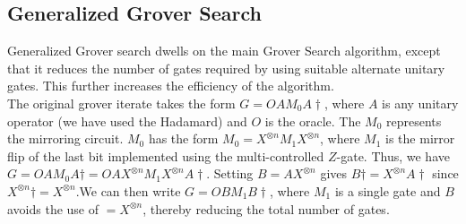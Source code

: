 \subsection{Generalized Grover Search}
Generalized Grover search\cite{gengrov} dwells on the main Grover Search algorithm, except that it reduces the number of gates required by using suitable alternate unitary gates. This further increases the efficiency of the algorithm.\\
The original grover iterate takes the form $G=OAM_0A\dagger$, where $A$ is any unitary operator (we have used the Hadamard) and $O$ is the oracle. The $M_0$ represents the mirroring circuit. $M_0$ has the form $M_0=X^{\otimes n}M_1X^{\otimes n}$, where $M_1$ is the mirror flip of the last bit implemented using the multi-controlled $Z$-gate. Thus, we have $G=OAM_0A\dagger=OAX^{\otimes n}M_1X^{\otimes n}A\dagger$. Setting $B=AX^{\otimes n}$ gives $B\dagger=X^{\otimes n}A\dagger$ since $X^{\otimes n}\dagger=X^{\otimes n}$.We can then write $G=OBM_1B\dagger$, where $M_1$ is a single gate and $B$ avoids the use of $=X^{\otimes n}$, thereby reducing the total number of gates.